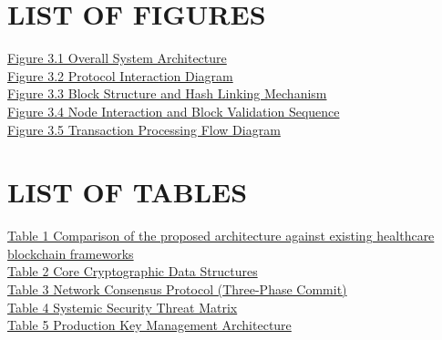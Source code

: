\documentclass[12pt]{article}
\begin{document}
\section*{LIST OF FIGURES}

\noindent\hyperref[fig:3.1]{Figure 3.1 Overall System Architecture}\dotfill\pageref{fig:3.1}\\
\hyperref[fig:3.2]{Figure 3.2 Protocol Interaction Diagram}\dotfill\pageref{fig:3.2}\\
\hyperref[fig:3.3]{Figure 3.3 Block Structure and Hash Linking Mechanism}\dotfill\pageref{fig:3.3}\\
\hyperref[fig:3.4]{Figure 3.4 Node Interaction and Block Validation Sequence}\dotfill\pageref{fig:3.4}\\
\hyperref[fig:3.5]{Figure 3.5 Transaction Processing Flow Diagram}\dotfill\pageref{fig:3.5}

\newpage

\section*{LIST OF TABLES}

\noindent\hyperref[tab:comparison]{Table 1 Comparison of the proposed architecture against existing healthcare blockchain frameworks}\dotfill\pageref{tab:comparison}\\
\hyperref[tab:core-structures]{Table 2 Core Cryptographic Data Structures}\dotfill\pageref{tab:core-structures}\\
\hyperref[tab:consensus-protocol]{Table 3 Network Consensus Protocol (Three-Phase Commit)}\dotfill\pageref{tab:consensus-protocol}\\
\hyperref[tab:threat-matrix]{Table 4 Systemic Security Threat Matrix}\dotfill\pageref{tab:threat-matrix}\\
\hyperref[tab:key-management]{Table 5 Production Key Management Architecture}\dotfill\pageref{tab:key-management}
\newpage

\tableofcontents
\newpage
{}
\setcounter{page}{1}
\end{document}
